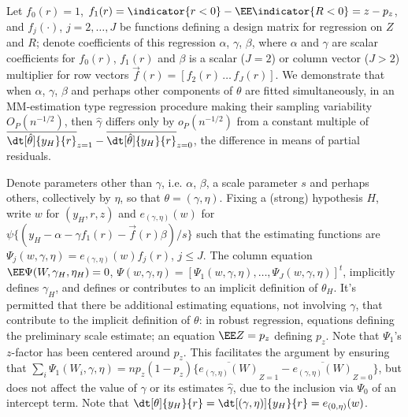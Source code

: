 Let $f_{0}(r)=1$,
$f_1(r) = \indicator{r<0} -\EE \indicator{R<0} = z - p_{z}$, and $f_j(\cdot)$, $j=2,
\ldots, J$ be functions defining  a design matrix for
regression on $Z$ and $R$; denote coefficients of this regression
$\alpha$, $\gamma$, $\beta$, where $\alpha$ and $\gamma$ are scalar
coefficients for $f_{0}(r)$, $f_{1}(r)$ and $\beta$ is a scalar
($J=2$) or column vector ($J>2$) multiplier for row vectors
$\vec{f}(r) = [f_{2}(r)\, \ldots\, f_{J}(r)]$.
We demonstrate that when $\alpha$, $\gamma$, $\beta$ and perhaps other
components of $\theta$ are fitted simultaneously,
in an MM-estimation type regression procedure making their sampling
variability $O_{P}(n^{-1/2})$,
then $\hat\gamma$ differs only by $o_{P}(n^{-1/2})$ from a constant
multiple of $\overline{\dt[\hat\theta]{y_{H}}{r}}_{z=1} - \overline{\dt[\hat\theta]{y_{H}}{r}}_{z=0}$,
the difference in means of partial residuals.

\sloppy
Denote parameters other than $\gamma$, i.e. $\alpha$, $\beta$, a
scale parameter $s$ and perhaps others, collectively by $\eta$, so that
$\theta = (\gamma, \eta)$. Fixing a (strong) hypothesis $H$, write ${w}$  for  $({y}_H,  {r}, z
)$ and $e_{(\gamma, \eta)}(w)$ for $\psi\{ (y_{H} - \alpha -
\gamma f_{1}(r) -
\vec{f}(r) \beta)/s\}$ such that
the estimating functions
are $\Psi_{j}(w, \gamma, \eta) = e_{(\gamma, \eta)}(w) f_j(r)$, $j\leq J$.  The column equation
$\EE \Psi(W, \gamma_{H}, \eta_{H}) =0$, $\Psi(w, \gamma, \eta) = [\Psi_{1}(w, \gamma, \eta), \ldots,
\Psi_{J}(w, \gamma, \eta)]^{t}$,  implicitly defines
$\gamma_{H}$, and defines or contributes to an implicit definition of
$\theta_{H}$.
It's permitted that there be additional estimating equations, not involving
$\gamma$, that contribute to the implicit definition of $\theta$:
in robust regression,  equations defining the preliminary scale
estimate; an equation $\EE Z = p_{z}$ defining $p_{z}$.  Note that
$\Psi_{1}$'s $z$-factor has been centered around $p_{z}$. This facilitates the argument by
ensuring that $\sum_{i}\Psi_{1}(W_{i}, \gamma, \eta) =
np_{z}(1-p_{z}) \{ \overline{e_{(\gamma, \eta)}(W)}_{Z=1} -
\overline{e_{(\gamma,\eta)}(W)}_{Z=0} \}$, but does
not affect the value of $\gamma$ or its estimates $\hat\gamma$, due to
the inclusion via $\Psi_{0}$ of an intercept term. Note that
$\dt[\theta]{{y_H}}{r}  = \dt[(\gamma, \eta)]{{y_H}}{r} = e_{(0, \eta)}(w)$.

